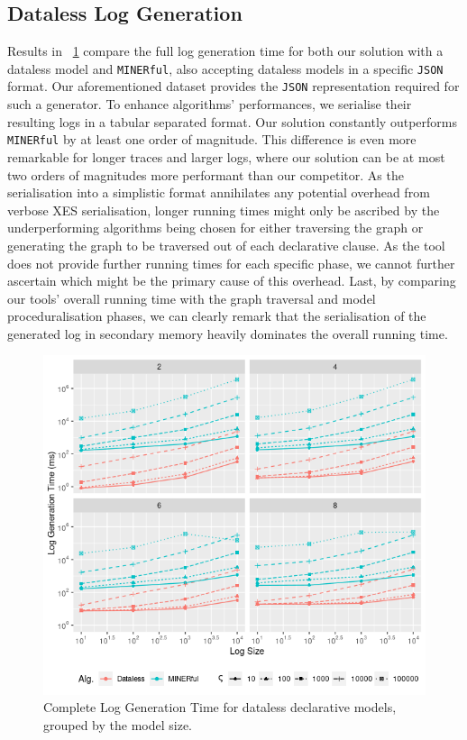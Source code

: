 \documentclass[acmengage]{acmart}
\begin{document}
\subsection{Dataless Log Generation}\label{ssec:dataless}
Results in \figurename~\ref{dataless} compare the full log generation time for both our solution with a dataless model and \texttt{MINERful}, also accepting dataless models in a specific \texttt{JSON} format. Our aforementioned dataset provides the \texttt{JSON} representation required for such a generator. To enhance algorithms' performances, we serialise their resulting logs in a tabular separated format. Our solution constantly outperforms \texttt{MINERful} by at least one order of magnitude. This difference is even more remarkable for longer traces and larger logs, where our solution can be at most two orders of magnitudes more performant than our competitor. As the serialisation into a simplistic format annihilates any potential overhead from verbose XES serialisation, longer running times might only be ascribed by the underperforming algorithms being chosen for either traversing the graph or generating the graph to be traversed out of each declarative clause. As the tool does not provide further running times for each specific phase, we cannot further ascertain which might be the primary cause of this overhead. Last, by comparing our tools' overall running time with the graph traversal and model proceduralisation phases, we can clearly remark that the serialisation of the generated log in secondary memory heavily dominates the overall running time.

\begin{figure}[!t]
\centering
\includegraphics[width=.9\linewidth]{fig/Minermer.png}
\caption{Complete Log Generation Time for dataless declarative models, grouped by the model size.}\label{dataless}
\vspace*{-.65cm}
\end{figure}
\end{document}
